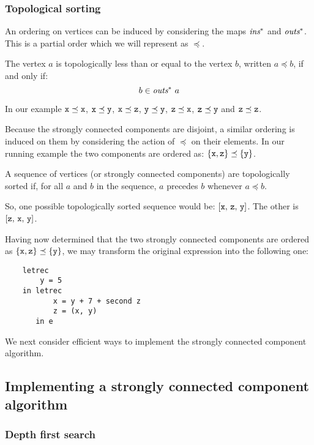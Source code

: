 \subsubsection{Topological sorting}

An ordering on vertices can be induced by considering the maps
$\mbox{\it ins}^\ast$ and $\mbox{\it outs}^\ast$. This is a partial
order which we will represent as $\preceq$.
\begin{definition}
The vertex $a$ is topologically less than or equal to the vertex $b$,
written $a \preceq b$, if and only if:
\[
 b \in \mbox{\it outs}^\ast ~a
\]
\end{definition}
In our example $\mbox{\tt x} \preceq \mbox{\tt x}$, $\mbox{\tt x} \preceq \mbox{\tt y}$, $\mbox{\tt x} \preceq
\mbox{\tt z}$, $\mbox{\tt y} \preceq \mbox{\tt y}$, $\mbox{\tt z} \preceq \mbox{\tt x}$, $\mbox{\tt z} \preceq \mbox{\tt y}$ and
$\mbox{\tt z} \preceq \mbox{\tt z}$.

Because the strongly connected components are disjoint, a similar
ordering is induced on them by considering the action of $\preceq$ on
their elements. In our running example the two components are
ordered as: $\{\mbox{\tt x},\mbox{\tt z}\}\preceq\{\mbox{\tt y}\}$.
\begin{definition}
A sequence of vertices (or strongly connected components) are
topologically sorted if, for all $a$ and $b$ in the sequence, $a$
precedes $b$ whenever $a \preceq b$.
\end{definition}
So, one possible topologically sorted sequence would be:
$[\mbox{\tt x},\,\mbox{\tt z},\,\mbox{\tt y}]$. The other is $[\mbox{\tt z},\,\mbox{\tt x},\,\mbox{\tt y}]$.

Having now determined that the two strongly connected components are
ordered as $\{\mbox{\tt x},\mbox{\tt z}\}\preceq\{\mbox{\tt y}\}$, we may transform the original
expression into the following one:
\begin{verbatim}
    letrec
        y = 5
    in letrec
           x = y + 7 + second z
           z = (x, y)
       in e
\end{verbatim}
We next consider efficient ways to implement the strongly connected
component algorithm.

\subsection{Implementing a strongly connected component algorithm}

\subsubsection{Depth first search}

